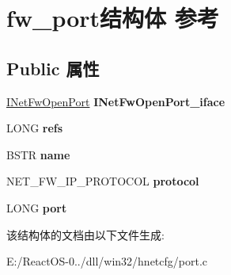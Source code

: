 \hypertarget{structfw__port}{}\section{fw\+\_\+port结构体 参考}
\label{structfw__port}
\subsection*{Public 属性}
\begin{DoxyCompactItemize}
\item 
\mbox{\label{structfw__port_a2cf52e44690a85fa3a92858577803d96}} 
\hyperlink{interface_i_net_fw_open_port}{I\+Net\+Fw\+Open\+Port} {\bfseries I\+Net\+Fw\+Open\+Port\+\_\+iface}
\item 
\mbox{\label{structfw__port_aac763c482e0b0efa1520e193de233167}} 
L\+O\+NG {\bfseries refs}
\item 
\mbox{\label{structfw__port_a8ab2687904d53dfe3c888ba4eb7808a0}} 
B\+S\+TR {\bfseries name}
\item 
\mbox{\label{structfw__port_ae4d08d39b7b33cc89deedda0c3c4eb3c}} 
N\+E\+T\+\_\+\+F\+W\+\_\+\+I\+P\+\_\+\+P\+R\+O\+T\+O\+C\+OL {\bfseries protocol}
\item 
\mbox{\label{structfw__port_a68054ced8c5a25991b4f0fb38a0481e6}} 
L\+O\+NG {\bfseries port}
\end{DoxyCompactItemize}


该结构体的文档由以下文件生成\+:\begin{DoxyCompactItemize}
\item 
E\+:/\+React\+O\+S-\/0../dll/win32/hnetcfg/port.\+c\end{DoxyCompactItemize}
